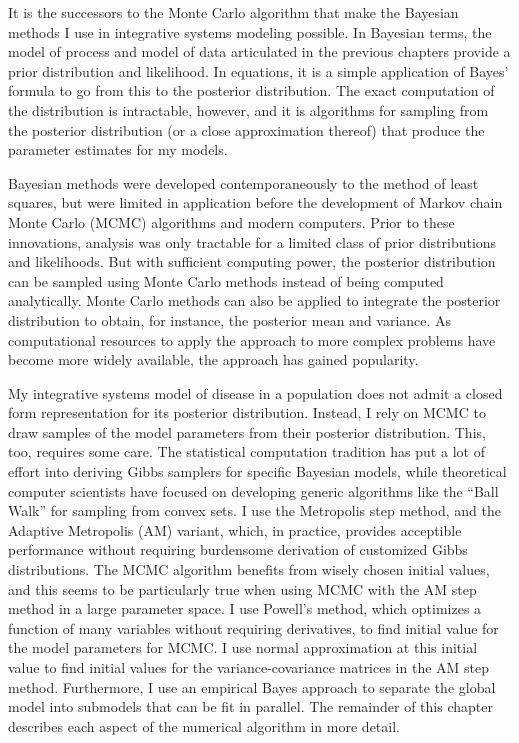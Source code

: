 It is the successors to the Monte Carlo algorithm that make the
Bayesian methods I use in integrative systems modeling possible.  In
Bayesian terms, the model of process and model of data articulated in
the previous chapters provide a prior distribution and
likelihood.  In equations, it is a simple application of Bayes'
formula to go from this to the posterior distribution.  The exact
computation of the distribution is intractable, however, and it is
algorithms for sampling from the posterior distribution (or a close
approximation thereof) that produce the parameter estimates for my
models.

Bayesian methods were developed contemporaneously to the method of
least squares, but were limited in application before the development
of Markov chain Monte Carlo (MCMC) algorithms and modern computers.
Prior to these innovations, analysis was only tractable for a limited
class of prior distributions and likelihoods. But with sufficient
computing power, the posterior distribution can be sampled using Monte
Carlo methods instead of being computed
analytically.\cite{gelman_bayesian_2003} Monte Carlo methods can also
be applied to integrate the posterior distribution to obtain, for
instance, the posterior mean and variance. As computational resources
to apply the approach to more complex problems have become more widely
available, the approach has gained popularity.\cite{tanner_em_2010}

My integrative systems model of disease in a population does not admit
a closed form representation for its posterior distribution.  Instead,
I rely on MCMC to draw samples of the model parameters from their
posterior distribution.  This, too, requires some care.  The
statistical computation tradition has put a lot of effort into
deriving Gibbs samplers for specific Bayesian models, while
theoretical computer scientists have focused on developing generic
algorithms like the ``Ball Walk'' for sampling from convex sets.  I
use the Metropolis step method, and the Adaptive Metropolis (AM)
variant,\cite{Haario_Adaptive_2001} which, in practice, provides
acceptible performance without requiring burdensome derivation of
customized Gibbs distributions. The MCMC algorithm benefits from
wisely chosen initial values, and this seems to be particularly true
when using MCMC with the AM step method in a large parameter space. I
use Powell's method, which optimizes a function of many variables
without requiring derivatives, to find initial value for the model
parameters for MCMC.\cite{powell_efficient_1964}  I use normal approximation at this initial
value to find initial values for the variance-covariance matrices in
the AM step method.  Furthermore, I use an empirical Bayes
approach to separate the global model into submodels that can be fit
in parallel.  The remainder of this chapter describes each aspect of
the numerical algorithm in more detail.

